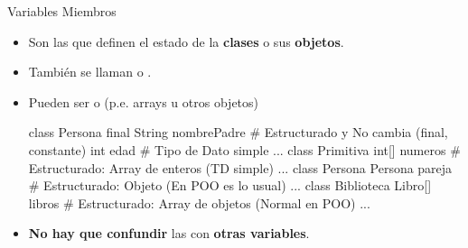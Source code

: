 \documentclass[10pt,envcountsect,spanish]{beamer}
\begin{document}
\begin{frame}[fragile, label={fr:objetosMiembros}]{Variables Miembros} 

\begin{itemize}
\item Son  las que definen el estado de la \textbf{clases} o sus \textbf{objetos}.
\item También se llaman  o .
\item Pueden ser  o  (p.e. arrays u otros objetos)

\unEjemplo {}\vskip-0.05cm
\begin{pyverbatim}[][frame=single, fontsize=\scriptsize]
class Persona{
   final String nombrePadre # Estructurado y No cambia (final, constante)
   int edad       # Tipo de Dato simple
   ...
}
class Primitiva {
   int[] numeros  # Estructurado: Array de enteros (TD simple)
   ...
}
class Persona {
   Persona pareja # Estructurado: Objeto (En POO es lo usual)
   ...
}
class Biblioteca {
   Libro[] libros # Estructurado: Array de objetos  (Normal en POO)
   ...
}
\end{pyverbatim}

\item \textbf{No hay que confundir} las  con \textbf{otras variables}.
\end{itemize}

\end{frame}
\end{document}
